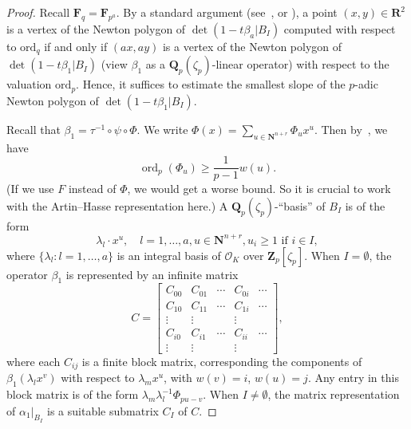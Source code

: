 \documentclass{amsart}
\numberwithin{equation}{section}
\theoremstyle{plain}
\theoremstyle{definition}
\renewcommand{\mathbb}{\mathbf}
\begin{document}
\begin{proof}
Recall \(\mathbb{F}_{q} = \mathbb{F}_{p^{a}}\).  By a standard
argument
(see~\cite[Lemma~7.1]{dwork:zeta-function-hypersurface-2}, or \cite[Eq.~(46)]{bombieri:exponential-sums-in-finite-fields-1}), a point
\((x,y) \in \mathbb{R}^{2}\) is a vertex of the Newton polygon of
\(\det(1-t\beta_{a}| B_{I})\) computed with respect to
\(\mathrm{ord}_{q}\) if and only if \((ax,ay)\) is a vertex of the
Newton polygon of \(\det(1-t\beta_{1}| B_{I})\) (view \(\beta_{1}\)
as a \(\mathbb{Q}_{p}(\zeta_{p})\)-linear operator) with respect to
the valuation \(\mathrm{ord}_{p}\).  Hence, it suffices to estimate
the smallest slope of the \(p\)-adic Newton polygon of
\(\det(1 - t\beta_{1}| B_{I})\).

Recall that \(\beta_{1} = \tau^{-1}\circ\psi\circ \Phi\).
We write \(\Phi(x) = \sum_{u\in \mathbb{N}^{n+r}}\Phi_{u} x^{u}\).
Then
by~\cite[Eq.~(2.12)]{adolphson-sperber:newton-polyhedra-degree-l-function},
we have
\begin{equation}\label{eq:as-bound}
\operatorname{ord}_{p}(\Phi_{u}) \geq \frac{1}{p-1}w(u).
\end{equation}
(If we use \(F\) instead of \(\Phi\), we would get a worse bound.
So it is crucial to work with the Artin--Hasse representation here.)
A \(\mathbb{Q}_{p}(\zeta_{p})\)-``basis'' of \(B_{I}\) is of the form
\begin{equation*}
\lambda_{l} \cdot x^{u}, \quad l=1,\ldots,a, u \in \mathbb{N}^{n+r}, u_{i} \geq 1 \text{ if } i\in I,
\end{equation*}
where \(\{\lambda_{l}:l=1,\ldots,a\}\) is an integral basis of
\(\mathcal{O}_{K}\) over \(\mathbb{Z}_{p}[\zeta_{p}]\).  When
\(I = \emptyset\), the operator \(\beta_{1}\) is represented by an
infinite matrix
\begin{equation*}
C=
\begin{bmatrix}
  C_{00} & C_{01} & \cdots & C_{0i} & \cdots \\
  C_{10} & C_{11} & \cdots & C_{1i} & \cdots \\
  \vdots & \vdots &       & \vdots \\
  C_{i0} & C_{i1} & \cdots & C_{ii} & \cdots \\
  \vdots & \vdots &      & \vdots
\end{bmatrix},
\end{equation*}
where each \(C_{ij}\) is a finite block matrix, corresponding the
components of \(\beta_{1}(\lambda_{l}x^{v})\) with respect
to \(\lambda_{m}x^{u}\), with \(w(v) = i\), \(w(u)=j\).  Any entry in
this block matrix is of the form
\(\lambda_{m}\lambda_{l}^{-1}\Phi_{pu-v}\).  When \(I\neq \emptyset\),
the matrix representation of \(\alpha_{1}|_{B_{I}}\) is a
suitable submatrix \(C_{I}\) of \(C\).


\end{proof}
\end{document}

